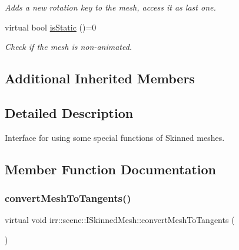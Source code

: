 \begin{DoxyCompactItemize}
\begin{DoxyCompactList}\small\item\em Adds a new rotation key to the mesh, access it as last one. \end{DoxyCompactList}\item 
\mbox{\label{classirr_1_1scene_1_1ISkinnedMesh_a2131a8693a84e29036ffff69955a2ec1}} 
virtual bool \hyperlink{classirr_1_1scene_1_1ISkinnedMesh_a2131a8693a84e29036ffff69955a2ec1}{is\+Static} ()=0
\begin{DoxyCompactList}\small\item\em Check if the mesh is non-\/animated. \end{DoxyCompactList}\end{DoxyCompactItemize}
\subsection*{Additional Inherited Members}


\subsection{Detailed Description}
Interface for using some special functions of Skinned meshes. 

\subsection{Member Function Documentation}
\mbox{\label{classirr_1_1scene_1_1ISkinnedMesh_ae63f3f1a74bf38c4b5113e3a5b96c0f3}} 
\subsubsection{\texorpdfstring{convert\+Mesh\+To\+Tangents()}{convertMeshToTangents()}\hspace{0.1cm}{\footnotesize\ttfamily [1/2]}}
{\footnotesize\ttfamily virtual void irr\+::scene\+::\+I\+Skinned\+Mesh\+::convert\+Mesh\+To\+Tangents (\begin{DoxyParamCaption}{ }\end{DoxyParamCaption})\hspace{0.3cm}{\ttfamily [pure virtual]}}



